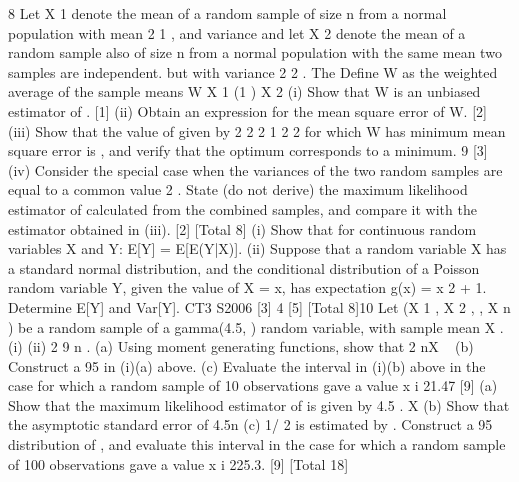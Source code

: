 \documentclass[a4paper,12pt]{article}
\begin{document}
\begin{enumerate}


8
Let X 1 denote the mean of a random sample of size n from a normal population with
mean
2
1 ,
and variance
and let X 2 denote the mean of a random sample also of
size n from a normal population with the same mean
two samples are independent.
but with variance
2
2 .
The
Define W as the weighted average of the sample means
W
X 1 (1
) X 2
(i) Show that W is an unbiased estimator of . [1]
(ii) Obtain an expression for the mean square error of W. [2]
(iii) Show that the value of
given by
2
2
2
1
2
2
for which W has minimum mean square error is
,
and verify that the optimum corresponds to a minimum.
9
[3]
(iv) Consider the special case when the variances of the two random samples are
equal to a common value 2 . State (do not derive) the maximum likelihood
estimator of calculated from the combined samples, and compare it with the
estimator obtained in (iii).
[2]
[Total 8]
(i) Show that for continuous random variables X and Y:
E[Y] = E[E(Y|X)].
(ii)
Suppose that a random variable X has a standard normal distribution, and the
conditional distribution of a Poisson random variable Y, given the value of
X = x, has expectation g(x) = x 2 + 1.
Determine E[Y] and Var[Y].
CT3 S2006
[3]
4
[5]
[Total 8]10
Let (X 1 , X 2 ,
, X n ) be a random sample of a gamma(4.5, ) random variable, with
sample mean X .
(i)
(ii)
2
9 n .
(a) Using moment generating functions, show that 2 nX ~
(b) Construct a 95%
in (i)(a) above.
(c) Evaluate the interval in (i)(b) above in the case for which a random
sample of 10 observations gave a value
x i 21.47
[9]
(a) Show that the maximum likelihood estimator of
is given by
4.5
.
X
(b)
Show that the asymptotic standard error of
4.5n
(c)
1/ 2
is estimated by
.
Construct a 95%
distribution of , and evaluate this interval in the case for which a
random sample of 100 observations gave a value
x i 225.3.
[9]
[Total 18]


\end{enumerate}
\end{document}
